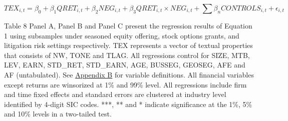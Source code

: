 \begin{table}[H]
\begin{center}
\begin{tabular}{lcccccc}
  		\bottomrule
  		\bottomrule
  	\end{tabular}%
  \end{center}
	\begin{footnotesize}
		\setcounter{equation}{0}
		\begin{equation}
			TEX_{i,t}=\beta_0+\beta_1QRET_{i,t}+\beta_2NEG_{i,t}+\beta_3QRET_{i,t}\times NEG_{i,t}+\sum\beta_nCONTROLS_{i,t}+\epsilon_{i,t}
		\end{equation}
		
		\noindent Table 8 Panel A, Panel B and Panel C present the regression results of Equation 1 using subsamples under seasoned equity offering, stock options grants, and litigation risk settings respectively. TEX represents a vector of textual properties that consists of NW, TONE and TLAG. All regressions control for SIZE, MTB, LEV, EARN, STD\_RET, STD\_EARN, AGE, BUSSEG, GEOSEG, AFE and AF (untabulated). See \hyperref[appb]{Appendix B} for variable definitions. All financial variables except returns are winsorized at 1\% and 99\% level. All regressions include firm and time fixed effects and standard errors are clustered at industry level identified by 4-digit SIC codes. ***, ** and * indicate significance at the 1\%, 5\% and 10\% levels in a two-tailed test. 
	\end{footnotesize}
\end{table}%

